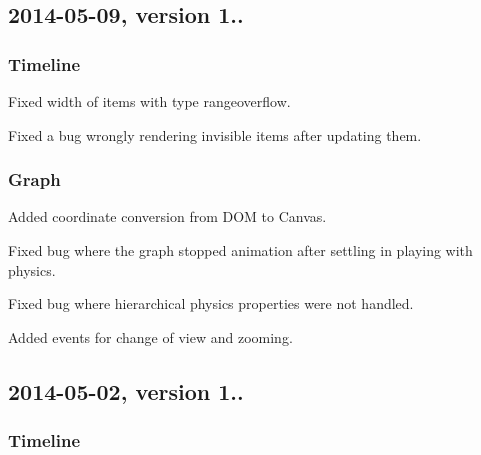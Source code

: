 \subsection*{2014-\/05-\/09, version 1..}

\subsubsection*{Timeline}


\begin{DoxyItemize}
\item Fixed width of items with type {\ttfamily rangeoverflow}.
\item Fixed a bug wrongly rendering invisible items after updating them.
\end{DoxyItemize}

\subsubsection*{Graph}


\begin{DoxyItemize}
\item Added coordinate conversion from D\+OM to Canvas.
\item Fixed bug where the graph stopped animation after settling in playing with physics.
\item Fixed bug where hierarchical physics properties were not handled.
\item Added events for change of view and zooming.
\end{DoxyItemize}

\subsection*{2014-\/05-\/02, version 1..}

\subsubsection*{Timeline}


